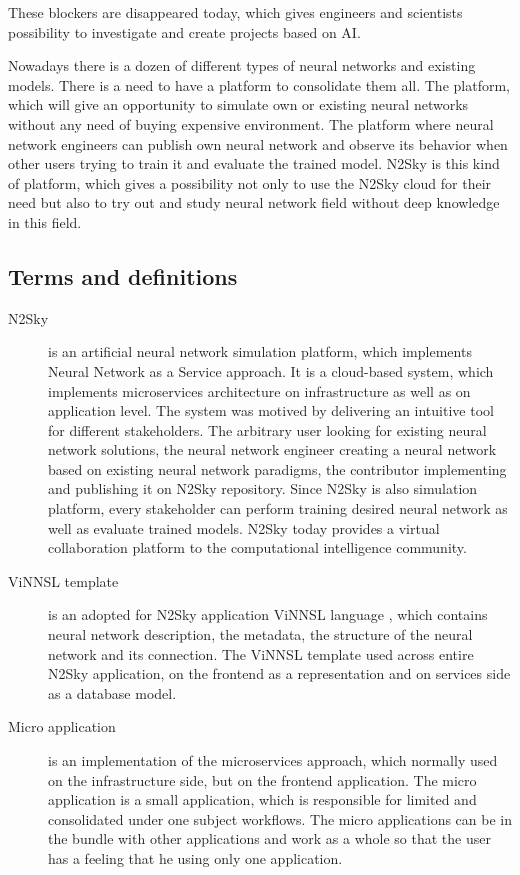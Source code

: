 These blockers are disappeared today, which gives engineers and scientists possibility to investigate and create projects based on AI. 

Nowadays there is a dozen of different types of neural networks and existing models. There is a need to have a platform to consolidate them all. The platform, which will give an opportunity to simulate own or existing neural networks without any need of buying expensive environment. The platform where neural network engineers can publish own neural network and observe its behavior when other users trying to train it and evaluate the trained model. N2Sky is this kind of platform, which gives a possibility not only to use the N2Sky cloud for their need but also to try out and study neural network field without deep knowledge in this field. 



\subsection{Terms and definitions}\label{Terms and definitions}

\begin{description}
\item[N2Sky] is an artificial neural network simulation platform, which implements Neural Network as a Service approach. It is a cloud-based system, which implements microservices architecture on infrastructure as well as on application level. The system was motived by delivering an intuitive tool for different stakeholders. The arbitrary user looking for existing neural network solutions, the neural network engineer creating a neural network based on existing neural network paradigms, the contributor implementing and publishing it on N2Sky repository. Since N2Sky is also simulation platform, every stakeholder can perform training desired neural network as well as evaluate trained models.  N2Sky today provides a virtual collaboration platform to the computational intelligence community.
\item[ViNNSL template] is an adopted for N2Sky application ViNNSL language \cite{Beran2008} , which contains neural network description, the metadata, the structure of the neural network and its connection. The ViNNSL template used across entire N2Sky application, on the frontend as a representation and on services side as a database model.
\item[Micro application] is an implementation of the microservices approach, which normally used on the infrastructure side, but on the frontend application. The micro application is a small application, which is responsible for limited and consolidated under one subject workflows. The micro applications can be in the bundle with other applications and work as a whole so that the user has a feeling that he using only one application.
\end{description}



